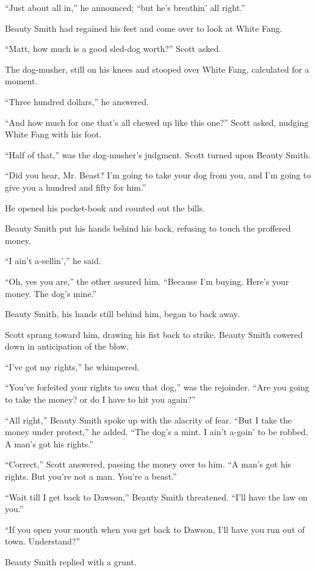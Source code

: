 \documentclass[10pt]{book}
\begin{document}
“Just about all in,” he announced; “but he’s breathin’ all right.”

Beauty Smith had regained his feet and come over to look at White Fang.

“Matt, how much is a good sled-dog worth?” Scott asked.

The dog-musher, still on his knees and stooped over White Fang,
calculated for a moment.

“Three hundred dollars,” he answered.

“And how much for one that’s all chewed up like this one?” Scott asked,
nudging White Fang with his foot.

“Half of that,” was the dog-musher’s judgment. Scott turned upon Beauty
Smith.

“Did you hear, Mr. Beast? I’m going to take your dog from you, and I’m
going to give you a hundred and fifty for him.”

He opened his pocket-book and counted out the bills.

Beauty Smith put his hands behind his back, refusing to touch the
proffered money.

“I ain’t a-sellin’,” he said.

“Oh, yes you are,” the other assured him. “Because I’m buying. Here’s
your money. The dog’s mine.”

Beauty Smith, his hands still behind him, began to back away.

Scott sprang toward him, drawing his fist back to strike. Beauty Smith
cowered down in anticipation of the blow.

“I’ve got my rights,” he whimpered.

“You’ve forfeited your rights to own that dog,” was the rejoinder. “Are
you going to take the money? or do I have to hit you again?”

“All right,” Beauty Smith spoke up with the alacrity of fear. “But I
take the money under protest,” he added. “The dog’s a mint. I ain’t
a-goin’ to be robbed. A man’s got his rights.”

“Correct,” Scott answered, passing the money over to him. “A man’s got
his rights. But you’re not a man. You’re a beast.”

“Wait till I get back to Dawson,” Beauty Smith threatened. “I’ll have
the law on you.”

“If you open your mouth when you get back to Dawson, I’ll have you run
out of town. Understand?”

Beauty Smith replied with a grunt.
\end{document}
